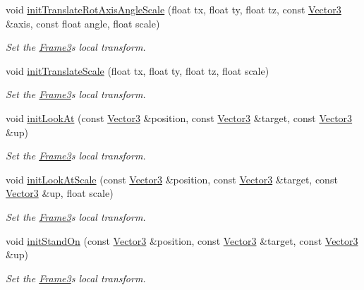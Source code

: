 \begin{DoxyCompactItemize}
void \hyperlink{class_magnum_1_1_frame3_a7ba0768f41a6ade313be98aae276d271}{init\+Translate\+Rot\+Axis\+Angle\+Scale} (float tx, float ty, float tz, const \hyperlink{class_magnum_1_1_vector3}{Vector3} \&axis, const float angle, float scale)
\begin{DoxyCompactList}\small\item\em Set the \hyperlink{class_magnum_1_1_frame3}{Frame3}\textquotesingle{}s local transform. \end{DoxyCompactList}\item 
void \hyperlink{class_magnum_1_1_frame3_a86f0c879ee98d644332b67cf91d066ed}{init\+Translate\+Scale} (float tx, float ty, float tz, float scale)
\begin{DoxyCompactList}\small\item\em Set the \hyperlink{class_magnum_1_1_frame3}{Frame3}\textquotesingle{}s local transform. \end{DoxyCompactList}\item 
void \hyperlink{class_magnum_1_1_frame3_ab053a9525153c0d772d95fd309ae99b6}{init\+Look\+At} (const \hyperlink{class_magnum_1_1_vector3}{Vector3} \&position, const \hyperlink{class_magnum_1_1_vector3}{Vector3} \&target, const \hyperlink{class_magnum_1_1_vector3}{Vector3} \&up)
\begin{DoxyCompactList}\small\item\em Set the \hyperlink{class_magnum_1_1_frame3}{Frame3}\textquotesingle{}s local transform. \end{DoxyCompactList}\item 
void \hyperlink{class_magnum_1_1_frame3_a78d62bc06554dc2fa8b0405bdcbb03c9}{init\+Look\+At\+Scale} (const \hyperlink{class_magnum_1_1_vector3}{Vector3} \&position, const \hyperlink{class_magnum_1_1_vector3}{Vector3} \&target, const \hyperlink{class_magnum_1_1_vector3}{Vector3} \&up, float scale)
\begin{DoxyCompactList}\small\item\em Set the \hyperlink{class_magnum_1_1_frame3}{Frame3}\textquotesingle{}s local transform. \end{DoxyCompactList}\item 
void \hyperlink{class_magnum_1_1_frame3_a17b6bc5c746e4563e92f505755c5acd1}{init\+Stand\+On} (const \hyperlink{class_magnum_1_1_vector3}{Vector3} \&position, const \hyperlink{class_magnum_1_1_vector3}{Vector3} \&target, const \hyperlink{class_magnum_1_1_vector3}{Vector3} \&up)
\begin{DoxyCompactList}\small\item\em Set the \hyperlink{class_magnum_1_1_frame3}{Frame3}\textquotesingle{}s local transform. \end{DoxyCompactList}\item 

\end{DoxyCompactItemize}
